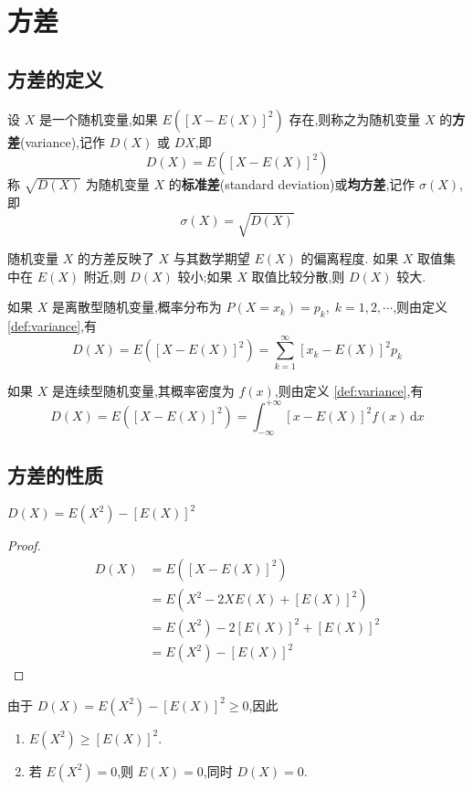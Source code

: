 \section{方差}

\subsection{方差的定义}

\begin{definition}
    \indent 设 $X$ 是一个随机变量,如果 $E([X-E(X)]^2)$ 存在,则称之为随机变量 $X$ 的\textbf{方差}(variance),记作 $D(X)$ 或 $DX$,即
    $$
    D(X) = E([X-E(X)]^2)
    $$
    称 $\sqrt{D(X)}$ 为随机变量 $X$ 的\textbf{标准差}(standard deviation)或\textbf{均方差},记作 $\sigma(X)$,即
    $$
    \sigma(X) = \sqrt{D(X)}
    $$
\end{definition}

随机变量 $X$ 的方差反映了 $X$ 与其数学期望 $E(X)$ 的偏离程度. 如果 $X$ 取值集中在 $E(X)$ 附近,则 $D(X)$ 较小;如果 $X$ 取值比较分散,则 $D(X)$ 较大.

如果 $X$ 是离散型随机变量,概率分布为 $P(X=x_k) = p_k, \; k=1,2,\cdots$,则由定义 \ref{def:variance},有
$$
D(X) = E([X-E(X)]^2) = \sum_{k=1}^{\infty} [x_k - E(X)]^2 p_k
$$

如果 $X$ 是连续型随机变量,其概率密度为 $f(x)$,则由定义 \ref{def:variance},有
$$
D(X) = E([X-E(X)]^2) = \int_{-\infty}^{+\infty} [x - E(X)]^2 f(x) \, \text{d}x
$$

\subsection{方差的性质}

\begin{property}
    \indent $D(X) = E(X^2) - [E(X)]^2$
\end{property}

\begin{proof}
    $$
    \begin{aligned}
        D(X) &= E([X-E(X)]^2) \\
        &= E(X^2 - 2XE(X) + [E(X)]^2) \\
        &= E(X^2) - 2[E(X)]^2 + [E(X)]^2 \\
        &= E(X^2) - [E(X)]^2
    \end{aligned}
    $$
\end{proof}

\begin{corollary}
    \indent 由于 $D(X) = E(X^2) - [E(X)]^2 \geqslant 0$,因此
    \begin{enumerate}
        \item $E(X^2) \geqslant [E(X)]^2$.
        \item 若 $E(X^2) = 0$,则 $E(X)=0$,同时 $D(X)=0$.
    \end{enumerate}
\end{corollary}

